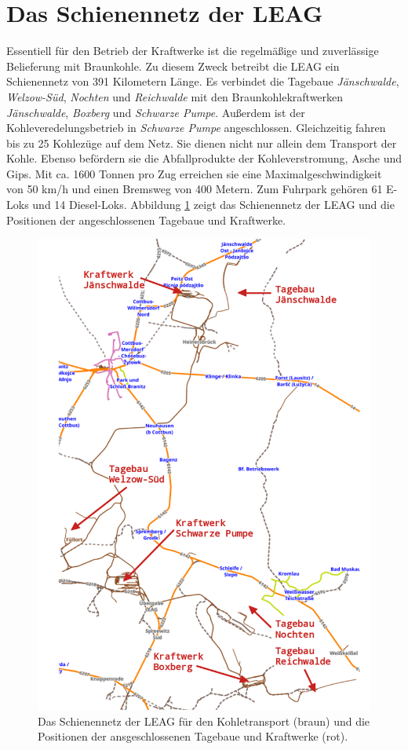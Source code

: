 \section{Das Schienennetz der LEAG}

Essentiell für den Betrieb der Kraftwerke ist die regelmäßige und zuverlässige Belieferung mit Braunkohle. Zu diesem Zweck betreibt die LEAG  ein Schienennetz von 391 Kilometern Länge\cite{hertzer_eisenbahner_2018}. Es verbindet die Tagebaue \emph{Jänschwalde}, \emph{Welzow-Süd}, \emph{Nochten} und \emph{Reichwalde} mit den Braunkohlekraftwerken \emph{Jänschwalde}, \emph{Boxberg} und \emph{Schwarze Pumpe}. Außerdem ist der Kohleveredelungsbetrieb in \emph{Schwarze Pumpe} angeschlossen\cite{noauthor_tagebau_2023}. Gleichzeitig fahren bis zu 25 Kohlezüge auf dem Netz. Sie dienen nicht nur allein dem Transport der Kohle. Ebenso befördern sie die Abfallprodukte der Kohleverstromung, Asche und Gips. Mit ca. 1600 Tonnen pro Zug erreichen sie eine Maximalgeschwindigkeit von 50 km/h und einen Bremsweg von 400 Metern. Zum Fuhrpark gehören 61 E-Loks und 14 Diesel-Loks\cite{hertzer_eisenbahner_2018}. Abbildung \ref{fig:leag-netz} zeigt das Schienennetz der LEAG und die Positionen der angeschlossenen Tagebaue und Kraftwerke.

\begin{figure}[H]
	\centering
	\includegraphics[width=0.75\linewidth]{images/LEAG-Netz-annotated.png}
	\caption{Das Schienennetz der LEAG für den Kohletransport (braun) und die Positionen der ansgeschlossenen Tagebaue und Kraftwerke (rot).}
	\label{fig:leag-netz}
\end{figure}